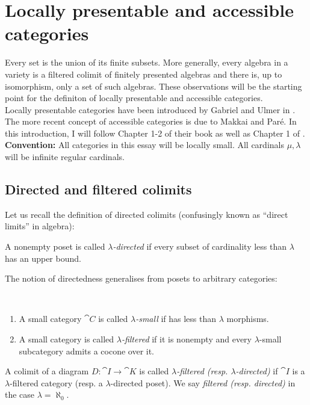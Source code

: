 \section{Locally presentable and accessible categories}
\label{sec:presentableaccessible}

Every set is the union of its finite subsets. More generally, every algebra in a variety is a filtered colimit of finitely presented algebras and there is, up to isomorphism, only a set of such algebras. These observations will be the starting point for the definiton of locally presentable and accessible categories. \\

Locally presentable categories have been introduced by Gabriel and Ulmer in \cite{GabrielUlmer}. The more recent concept of accessible categories is due to Makkai and Paré. In this introduction, I will follow Chapter 1-2 of their book \cite{MakkaiPare} as well as Chapter 1 of \cite{AdamekRosicky}.\\

\textbf{Convention: } All categories in this essay will be locally small. All cardinals $\mu,\lambda$ will be infinite regular cardinals.

\subsection{Directed and filtered colimits}

Let us recall the definition of directed colimits (confusingly known as ``direct limits'' in algebra):
\begin{Definition}
A nonempty poset is called \emph{$\lambda$-directed} if every subset of cardinality less than $\lambda$ has an upper bound.
\end{Definition}

The notion of directedness generalises from posets to arbitrary categories:

\begin{Definition}\
\begin{enumerate}
\item A small category $\cat C$ is called \emph{$\lambda$-small} if has less than $\lambda$ morphisms. 
\item A small category is called \emph{$\lambda$-filtered} if it is nonempty and every $\lambda$-small subcategory admits a cocone over it. 
\end{enumerate}
A colimit of a diagram $D : \cat I \to \cat K$ is called \emph{$\lambda$-filtered (resp. $\lambda$-directed)} if $\cat I$ is a $\lambda$-filtered category (resp. a $\lambda$-directed poset). We say \emph{filtered (resp. directed)} in the case $\lambda = \aleph_0$.
\end{Definition}

